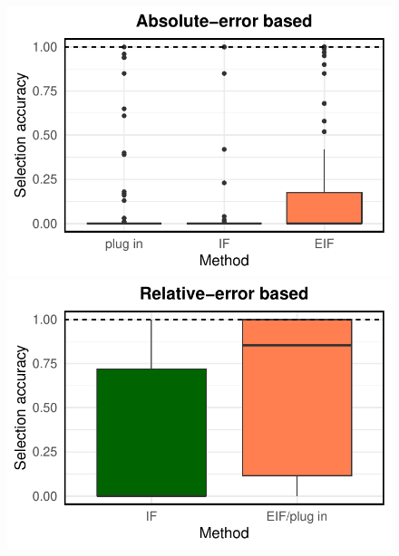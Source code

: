 \documentclass{article}
\theoremstyle{plain}
\theoremstyle{definition}
\theoremstyle{plain}
\begin{document}
\begin{figure}[h]
\begin{minipage}{0.3\textwidth}
                \includegraphics[clip, trim = 0cm 0cm 0cm 0cm, width = \textwidth]{plot/ACIC_nonlinear_propensity_linear_HTE_selection_accuracy_absolute_error.pdf}
        \end{minipage}
            \begin{minipage}{0.3\textwidth}
                \centering
                \includegraphics[clip, trim = 0cm 0cm 0cm 0cm, width = \textwidth]{plot/ACIC_nonlinear_propensity_linear_HTE_selection_accuracy_relative_error.pdf}
        \end{minipage}
                \begin{minipage}{0.3\textwidth}
                \centering

\end{minipage}
\end{figure}
\end{document}
